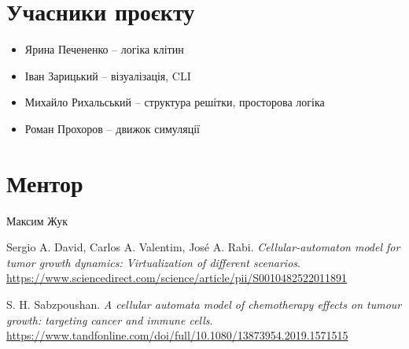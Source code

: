 \documentclass{article}
\begin{document}
\section{Учасники проєкту}
\begin{itemize}
    \item Ярина Печененко – логіка клітин
    \item Іван Зарицький – візуалізація, CLI
    \item Михайло Рихальський – структура решітки, просторова логіка
    \item Роман Прохоров – движок симуляції
\end{itemize}

\section{Ментор}
Максим Жук
\begin{thebibliography}{99}

Sergio A. David, Carlos A. Valentim, José A. Rabi. \textit{Cellular-automaton model for tumor growth dynamics: Virtualization of different scenarios}.\\
\href{https://www.sciencedirect.com/science/article/pii/S0010482522011891}{https://www.sciencedirect.com/science/article/pii/S0010482522011891}

S. H. Sabzpoushan. \textit{A cellular automata model of chemotherapy effects on tumour growth: targeting cancer and immune cells}.\\
\href{https://www.tandfonline.com/doi/full/10.1080/13873954.2019.1571515}{https://www.tandfonline.com/doi/full/10.1080/13873954.2019.1571515}

\end{thebibliography}
\end{document}
